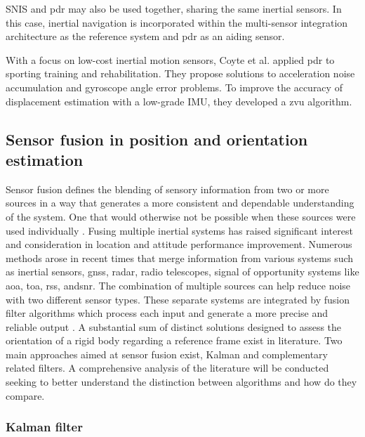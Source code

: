SNIS and \acrshort{pdr} may also be used together, sharing the same inertial sensors. In this case, inertial navigation is incorporated within the multi-sensor integration architecture as the reference system and \acrshort{pdr} as an aiding sensor.


With a focus on low-cost inertial motion sensors, Coyte et al. \cite{coyte2013displacement} applied \acrshort{pdr} to sporting training and rehabilitation. They propose solutions to acceleration noise accumulation and gyroscope angle error problems. To improve the accuracy of displacement estimation with a low-grade IMU, they developed a \acrshort{zvu} algorithm.

\subsection{Sensor fusion in position and orientation estimation }

Sensor fusion defines the blending of sensory information from two or more sources in a way that generates a more consistent and dependable understanding of the system. One that would otherwise not be possible when these sources were used individually \cite{hall1997introduction}. Fusing multiple inertial systems has raised significant interest and consideration in location and attitude performance improvement. Numerous methods arose in recent times that merge information from various systems such as inertial sensors, \acrshort{gnss}, radar, radio telescopes, signal of opportunity systems like \acrfull{aoa}, \acrfull{toa}, \acrfull{rss}, and\acrfull{snr}. The combination of multiple sources can help reduce noise with two different sensor types. These separate systems are integrated by fusion filter algorithms which process each input and generate a more precise and reliable output \cite{elmenreich2002introduction}. A substantial sum of distinct solutions designed to assess the orientation of a rigid body regarding a reference frame exist in literature. Two main approaches aimed at sensor fusion exist, Kalman and complementary related filters. A comprehensive analysis of the literature will be conducted seeking to better understand the distinction between algorithms and how do they compare.

\subsubsection{Kalman filter}

